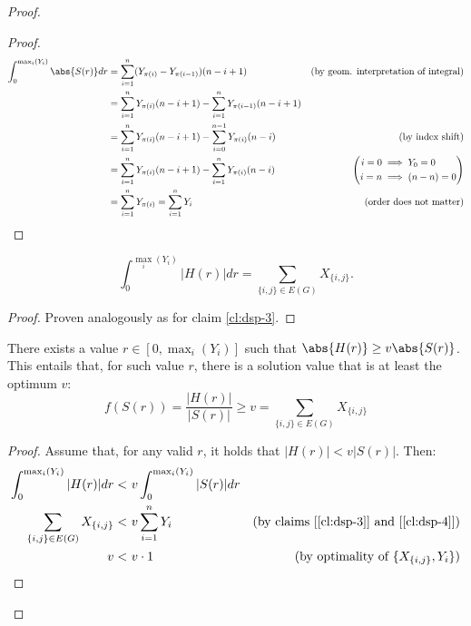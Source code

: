 \begin{proof}
\begin{proof}
        \begin{align*}
               \int_0^{\max_i(Y_i)} \abs{S(r)} dr
            &= \sum_{i = 1}^n (Y_{\pi(i)} - Y_{\pi(i - 1)}) (n - i + 1)                             & \text{(by geom. interpretation of integral)} \\
            &= \sum_{i = 1}^n Y_{\pi(i)} (n - i + 1) - \sum_{i = 1}^n Y_{\pi(i - 1)} (n - i + 1)    & \\
            &= \sum_{i = 1}^n Y_{\pi(i)} (n - i + 1) - \sum_{i = 0}^{n - 1} Y_{\pi(i)} (n - i)      & \text{(by index shift)} \\
            &= \sum_{i = 1}^n Y_{\pi(i)} (n - i + 1) - \sum_{i = 1}^n Y_{\pi(i)} (n - i)            & \left( \begin{aligned} i = 0 &\implies Y_0 = 0 \\ i = n &\implies (n - n) = 0 \end{aligned} \right) \\
            &= \sum_{i = 1}^n Y_{\pi(i)} = \sum_{i = 1}^n Y_i                                       & \text{(order does not matter)}
        \end{align*}
        
    \end{proof}
    
    \begin{claim}\label{cl:dsp-4}
        \begin{equation}
            \int_0^{\max_i(Y_i)} |H(r)|dr = \sum_{\{i, j\} \in E(G)} X_{\{i, j\}}.
        \end{equation}
    \end{claim}

    \begin{proof}
        Proven analogously as for claim \ref{cl:dsp-3}.
    \end{proof}
    
    \begin{claim}\label{cl:dsp-5}
        There exists a value $r \in [0, \max_i(Y_i)]$ such that $\abs{H(r)} \geq v \abs{S(r)}$. This entails that, for such value $r$, there is a solution value that is at least the optimum $v$:
        \[
            f(S(r)) = \frac{|H(r)|}{|S(r)|} \geq v = \sum_{\{i,j\} \in E(G)} X_{\{i, j\}}
        \]
    \end{claim}
    
    \begin{proof}
        Assume that, for any valid $r$, it holds that $|H(r)| < v|S(r)|$. Then:
        \begin{align*}
            \int_0^{\max_i(Y_i)} |H(r)| dr          <&\ v \int_0^{\max_i(Y_i)} |S(r)| dr    & \\
            \sum_{\{i, j\} \in E(G)} X_{\{i, j\}}   <&\ v \sum_{i = 1}^n Y_i                & \text{(by claims [\ref{cl:dsp-3}] and [\ref{cl:dsp-4}])} \\
            v                                       <&\ v \cdot 1                           & \text{(by optimality of $\{X_{\{i, j\}}, Y_i\}$)}
        \end{align*}


\end{proof}
\end{proof}
